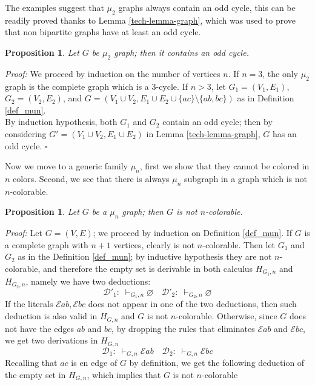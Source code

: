 \documentclass[a4paper,12pt,oneside]{book}
\newtheorem{proposition}[theorem]{Proposition}
\newcommand{\E}{\mathscr{E}}
\newcommand{\D}{\mathscr{D}}
\newcommand*{\QED}{\hfill\ensuremath{\square}}
\let\emptyset\varnothing
\begin{document}
\noindent The examples suggest that $\mu_2$ graphs always contain an odd cycle, this can be readily proved thanks to Lemma  \ref{tech-lemma-graph}, which was used to prove that  non bipartite graphs have at least an odd cycle.
\begin{proposition}\label{contains-odd}
Let $G$ be $\mu_2$ graph; then it contains an odd cycle.
\end{proposition}

\textit{Proof:} 
We proceed by induction on the number of vertices $n$. If $n=3$, the only $\mu_2$ graph is the complete graph which is a 3-cycle. If $n>3$, let $G_1=(V_1,E_1)$, $G_2=(V_2,E_2)$, and $G=(V_1\cup V_2, E_1\cup E_2\cup\{ac\} \setminus\{ab,bc\} )$ as in Definition \ref{def_mun}. 
\\By induction hypothesis, both $G_1$ and $G_2$ contain an odd cycle; then by considering $G'=(V_1\cup V_2, E_1\cup E_2)$ in Lemma \ref{tech-lemma-graph}, $G$ has an odd cycle. \QED


\noindent 
Now we move to a generic family $\mu_n$, first we show that they cannot be colored in $n$ colors. Second, we see that there is always $\mu_n$ subgraph in a graph which is not $n$-colorable.
\begin{proposition}\label{pr-nocolor}
Let $G$ be a $\mu_n$ graph; then $G$ is not $n$-colorable.
\end{proposition}
\textit{Proof:} 
Let $G=(V,E)$; we proceed by induction on Definition \ref{def_mun}. If $G$ is a complete graph with $n+1$ vertices, clearly is not $n$-colorable. Then let $G_1$ and $G_2$ as in the Definition \ref{def_mun}; by inductive hypothesis they are not  $n$-colorable, and therefore the empty set is derivable in both calculus $H_{G_1,n}$ and $H_{G_2,n}$, namely we have two deductions:
$$
 \D'_1:\; \vdash_{G_1,n} \emptyset  \quad \D'_2:\; \vdash_{G_2,n} \emptyset
$$
If the literals $\E ab, \E bc$ does not appear in one of the two deductions, then such deduction is also valid in $H_{G,n}$ and $G$ is not $n$-colorable.
Otherwise, since $G$ does not have the edges $ab$ and $bc$, by dropping the rules that eliminates $\E ab$ and $\E bc$, we get two derivations in $H_{G,n}$
$$
 \D_1:\; \vdash_{G,n} \E ab  \quad \D_2:\; \vdash_{G,n} \E bc 
$$
Recalling that $ac$ is en edge of $G$ by definition, we get the following deduction of the empty set in $H_{G,n}$, which implies that $G$ is not $n$-colorable

\end{document}
